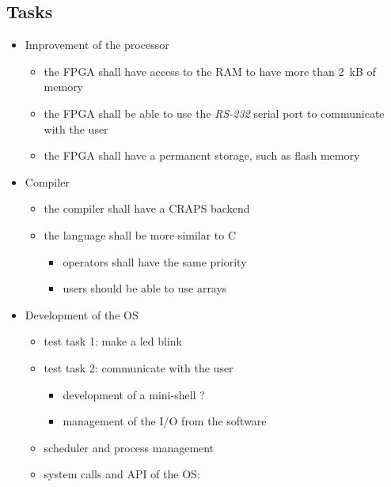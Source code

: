 \documentclass{article}
\begin{document}
  \newpage
  \begin{appendix}
      \section{Tasks}
      \begin{itemize}
        \item Improvement of the processor
          \begin{itemize}
            \item the FPGA shall have access to the RAM to have more than
              \SI{2}{kB} of memory
            \item the FPGA shall be able to use the \textit{RS-232} serial port
              to communicate with the user
            \item the FPGA shall have a permanent storage, such as flash memory
          \end{itemize}
        \item Compiler
          \begin{itemize}
            \item the compiler shall have a CRAPS backend
            \item the language shall be more similar to C
              \begin{itemize}
                \item operators shall have the same priority
                \item users should be able to use arrays
              \end{itemize}
          \end{itemize}
          \item Development of the OS
            \begin{itemize}
              \item test task 1: make a led blink
              \item test task 2: communicate with the user
                \begin{itemize}
                  \item development of a mini-shell ?
                  \item management of the I/O from the software
                \end{itemize}
              \item scheduler and process management
              \item system calls and API of the OS:
                \begin{itemize}

\end{itemize}
\end{itemize}
\end{itemize}
\end{appendix}
\end{document}
